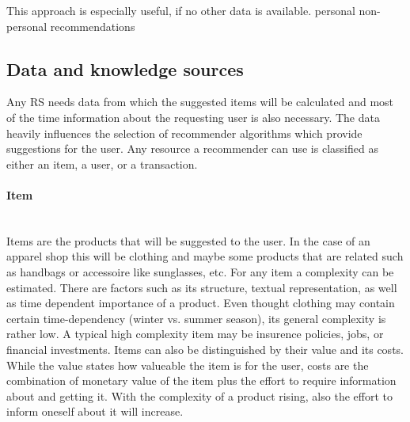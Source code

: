 This approach is especially useful, if no other data is available.
\citep[p.~10-11]{ricci:2011}
{\color{red} personal non-personal recommendations}



\subsection{Data and knowledge sources}
\label{sec:data-knowledge-source}
Any RS needs data from which the suggested items will be calculated and most of the time information about the requesting user is also necessary.
The data heavily influences the selection of recommender algorithms which provide suggestions for the user.\citep[p.~7-8]{ricci:2011}
Any resource a recommender can use is classified as either an item, a user, or a transaction.

\paragraph{Item}~\\
Items are the products that will be suggested to the user.
In the case of an apparel shop this will be clothing and maybe some products that are related such as handbags or accessoire like sunglasses, etc.
For any item a complexity can be estimated.
There are factors such as its structure, textual representation, as well as time dependent importance of a product.
Even thought clothing may contain certain time-dependency (winter vs. summer season), its general complexity is rather low.
A typical high complexity item may be insurence policies, jobs, or financial investments.
Items can also be distinguished by their value and its costs.
While the value states how valueable the item is for the user, costs are the combination of monetary value of the item plus the effort to require information about and getting it.
With the complexity of a product rising, also the effort to inform oneself about it will increase.
\citep[p.~8]{ricci:2011}

